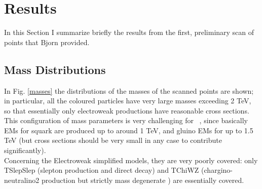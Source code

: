 \documentclass[a4paper,11pt]{article}
\begin{document}
\clearpage
\section{Results}
In this Section I summarize briefly the results from the first, preliminary scan of points that Bjorn provided.

\subsection{Mass Distributions}
In Fig. \ref{masses} the distributions of the masses of the scanned points are shown; in particular, all the coloured particles have very large masses exceeding 2 TeV, so that essentially only electroweak productions have reasonable cross sections.
This configuration of mass parameters is very challenging for \SMO~, since basically EMs for squark are produced up to around 1 TeV, and gluino EMs for up to 1.5 TeV (but cross sections should be very small in any case to contribute significantly). 
\\
Concerning the Electroweak simplified models, they are very poorly covered: only TSlepSlep (slepton production and direct decay) and TChiWZ (chargino-neutralino2 production but strictly mass degenerate ) are essentially covered. 
\end{document}
